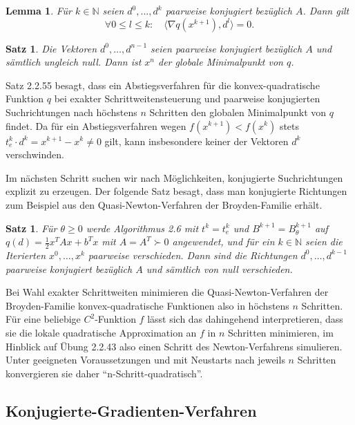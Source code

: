 \documentclass[11pt]{scrreprt}
\newcounter{thm}
\theoremstyle{thmstyle}
\numberwithin{thm}{section}
\newtheorem{lemma}[thm]{Lemma}
\newtheorem{satz}[thm]{Satz}
\begin{document}
\begin{lemma}
	Für $k\in \mathbb{N}$ seien $d^0, \dotsc, d^k$ paarweise konjugiert bezüglich $A$. Dann gilt
	$$ \forall 0 \leq l \leq k: \quad \langle \nabla q(x^{k+1}), d^l \rangle = 0. $$
\end{lemma}		

\begin{satz}
	Die Vektoren $d^0, \dotsc, d^{n-1}$ seien paarweise konjugiert bezüglich $A$ und sämtlich ungleich null. Dann ist $x^n$ der globale Minimalpunkt von $q$.
\end{satz}
		
Satz 2.2.55 besagt, dass ein Abstiegsverfahren für die konvex-quadratische Funktion $q$ bei exakter Schrittweitensteuerung und paarweise konjugierten Suchrichtungen nach höchstens $n$ Schritten den globalen Minimalpunkt von $q$ findet. Da für ein Abstiegsverfahren wegen $f (x^{k+1}) < f(x^k)$ stets $t_e^k \cdot d^k = x^{k+1} - x^k \neq 0$ gilt, kann insbesondere keiner der Vektoren $d^k$ verschwinden. ~\bigskip

Im nächsten Schritt suchen wir nach Möglichkeiten, konjugierte Suchrichtungen explizit zu erzeugen. Der folgende Satz besagt, dass man konjugierte Richtungen zum Beispiel aus den Quasi-Newton-Verfahren der Broyden-Familie erhält.

\begin{satz}
	Für $\theta \geq 0$ werde Algorithmus 2.6 mit $t^k = t_e^k$ und $B^{k+1} = B^{k+1}_{\theta}$ auf $q(d) = \frac{1}{2} x^T A x + b^T x$ mit $A = A^T \succ 0$ angewendet, und für ein $k \in \mathbb{N}$ seien die Iterierten $x^0, \dotsc, x^k$ paarweise verschieden. Dann sind die Richtungen $d^0, \dotsc, d^{k-1}$ paarweise konjugiert bezüglich $A$ und sämtlich von null verschieden.
\end{satz}

Bei Wahl exakter Schrittweiten minimieren die Quasi-Newton-Verfahren der Broyden-Familie konvex-quadratische Funktionen also in höchstens $n$ Schritten. Für eine beliebige $C^2$-Funktion $f$ lässt sich das dahingehend interpretieren, dass sie die lokale quadratische Approximation an $f$ in $n$ Schritten minimieren, im Hinblick auf Übung 2.2.43 also einen Schritt des Newton-Verfahrens simulieren. Unter geeigneten Voraussetzungen und mit Neustarts nach jeweils $n$ Schritten konvergieren sie daher \enquote{n-Schritt-quadratisch}.

\subsection*{Konjugierte-Gradienten-Verfahren}
\end{document}
